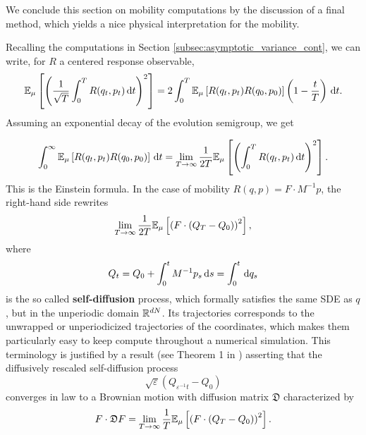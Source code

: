 We conclude this section on mobility computations by the discussion of a final method, which yields a nice physical interpretation for the mobility.
\begin{remark}
    Recalling the computations in Section \ref{subsec:asymptotic_variance_cont}, we can write, for $R$ a centered response observable,
    \begin{equation}
        \mathbb{E}_\mu\left[\left(\frac1{\sqrt{T}}\int_0^T R(q_t,p_t)\,\mathrm{d} t\right)^2\right]=2\int_0^T \mathbb{E}_\mu\left[R(q_t,p_t)R(q_0,p_0)\right]\left(1-\frac{t}T\right)\,\mathrm{d} t.
    \end{equation}
    Assuming an exponential decay of the evolution semigroup, we get 

    \begin{equation}
        \label{eq:einstein_formula}
        \int_0^\infty\mathbb{E}_\mu\left[R(q_t,p_t)R(q_0,p_0)\right]\,\mathrm{d} t=\underset{T\to\infty}{\lim}\,\frac{1}{2T}\mathbb{E}_\mu\left[\left(\int_0^T R(q_t,p_t)\,\mathrm{d} t\right)^2\right].
    \end{equation}
    This is the Einstein formula. In the case of mobility $R(q,p)=F\cdot M^{-1}p$, the right-hand side rewrites 
    \begin{equation}
        \label{eq:einstein_formula_mobility}
        \underset{T\to\infty}{\lim}\,\frac{1}{2T}\mathbb{E}_\mu\left[\left(F\cdot \left(Q_T-Q_0\right)\right)^2\right],
    \end{equation}
    where 
    \begin{equation}
        \label{eq:self_diffusion_process}
        Q_t=Q_0+\int_0^t M^{-1}p_s\,\mathrm{d} s=\int_0^t \,\mathrm{d} q_s
    \end{equation}
    is the so called \textbf{self-diffusion} process, which formally satisfies the same SDE as $q$, but in the unperiodic domain $\mathbb{R}^{dN}$. 
    Its trajectories corresponds to the unwrapped or unperiodicized trajectories of the coordinates, which makes them particularly easy to keep compute throughout a numerical simulation.
    This terminology is justified by a result (see Theorem 1 in \cite{R89}) asserting that the diffusively rescaled self-diffusion process 
    \[\sqrt{\varepsilon}(Q_{\varepsilon^{-1}t}-Q_0)\]
    converges in law to a Brownian motion with diffusion matrix $\mathfrak D$ characterized by
    \begin{equation}
        \label{eq:diffusion_tensor}
        F\cdot \mathfrak D F= \underset{T\to\infty}{\lim}\,\frac{1}{T}\mathbb{E}_\mu\left[\left(F\cdot \left(Q_T-Q_0\right)\right)^2\right].
    \end{equation}

\end{remark}
